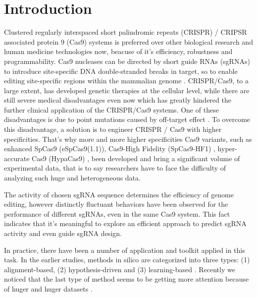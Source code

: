 \documentclass{bioinfo}
\begin{document}
\maketitle

\section{Introduction}

Clustered regularly interspaced short palindromic repeats (CRISPR) / CRIPSR associated protein 9 (Cas9) systems is preferred over other biological research and human medicine technologies now, 
beacuse of it's efficiency, robustness and programmability. 
Cas9 nucleases can be directed by short guide RNAs (sgRNAs) to introduce site-specific DNA double-stranded breaks in target, 
so to enable editing site-specific regions within the mammalian genome \citep{jinek2012a,cong2013multiplex,mali2013rnaguided}. 
CRISPR/Cas9, to a large extent, has developed genetic therapies at the cellular level, 
while there are still severe medical disadvantages even now which has greatly hindered the further clinical application of the CRISPR/Cas9 systems. 
One of these disadvantages is due to point mutations caused by off-target effect \citep{rubeis2018risks,kang2016introducing,ishii2017reproductive,liang2015crispr/cas9-mediated}. 
To overcome this disadvantage, a solution is to engineer CRISPR / Cas9 with higher specificities. 
That's why more and more higher specificities Cas9 variants, such as enhanced SpCas9 (eSpCas9(1.1)), 
Cas9-High Fidelity (SpCas9-HF1) \citep{ishii2017reproductive,slaymaker2016rationally}, hyper-accurate Cas9 (HypaCas9) \citep{kleinstiver2016high-fidelity}, 
been developed and bring a significant volume of experimental data, that is to say researchers have to face the difficulty of analyzing such huge and heterogeneous data.

The activity of chosen sgRNA sequence determines the efficiency of genome editing, 
however distinctly fluctuant behaviors have been observed for the performance of different sgRNAs, even in the same Cas9 system. 
This fact indicates that it's meaningful to explore an efficient approach to predict sgRNA activity and even guide sgRNA design. 

In practice, there have been a number of application and toolkit applied in this task. In the earlier studies, methods in silico are categorized into three types: 
(1) alignment-based, (2) hypothesis-driven and (3) learning-based \citep{chuai2018deepcrispr}. 
Recently we noticed that the last type of method seems to be getting more attention because of huger and huger datasets \citep{liu2019computational}. 
\end{document}
